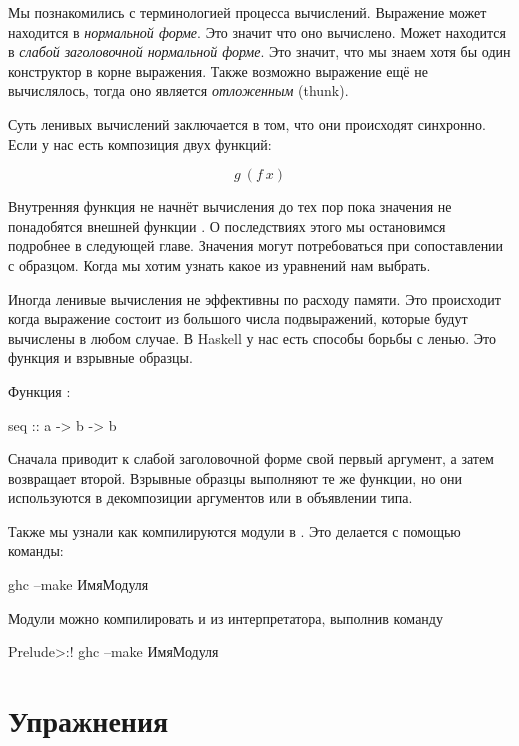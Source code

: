 Мы познакомились с терминологией процесса вычислений.
Выражение может находится в \emph{нормальной форме}. Это значит
что оно вычислено. Может находится в \emph{слабой заголовочной
нормальной форме}. Это значит, что мы знаем хотя бы один 
конструктор в корне выражения. Также возможно выражение 
ещё не вычислялось, тогда оно является \emph{отложенным} (thunk).

Суть ленивых вычислений заключается в том, что они
происходят синхронно. Если у нас есть 
композиция двух функций:

\[ g\ (f\ x) \]

Внутренняя функция  не начнёт вычисления до тех
пор пока значения не понадобятся внешней функции .
О последствиях этого мы остановимся подробнее в следующей главе.
Значения могут потребоваться при сопоставлении с образцом.
Когда мы хотим узнать какое из уравнений нам выбрать.

Иногда ленивые вычисления не эффективны по расходу памяти. 
Это происходит когда выражение состоит из большого числа
подвыражений, которые будут вычислены в любом случае.
В Haskell у нас есть способы борьбы с ленью. 
Это функция  и взрывные образцы. 

Функция :

\begin{code}
seq :: a -> b -> b
\end{code}

Сначала приводит к слабой заголовочной форме свой первый
аргумент, а затем возвращает второй. Взрывные образцы
выполняют те же функции, но они используются в декомпозиции 
аргументов или в объявлении типа. 

Также мы узнали как компилируются модули в . Это делается
с помощью команды:

\begin{code}
ghc --make ИмяМодуля
\end{code}

Модули можно компилировать и из интерпретатора, выполнив команду

\begin{code}
Prelude>:! ghc --make ИмяМодуля
\end{code}

\section{Упражнения}

